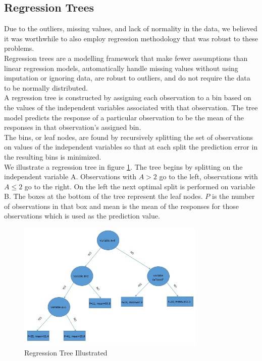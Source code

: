 \documentclass[12pt]{article}
\begin{document}
\subsection{Regression Trees}\label{sec:tree}
Due to the outliers, missing values, and lack of normality in the data, we believed it was worthwhile to also employ regression methodology that was robust to these problems. \\

Regression trees \cite{hastie2015statistical} are a modelling framework that make fewer assumptions than linear regression models, automatically handle missing values without using imputation or ignoring data, are robust to outliers, and do not require the data to be normally distributed. \\

A regression tree is constructed by assigning each observation to a bin based on the values of the independent variables associated with that observation. The tree model predicts the response of a particular observation to be the mean of the responses in that observation's assigned bin. \\

The bins, or leaf nodes, are found by recursively splitting the set of observations on values of the independent variables so that at each split the prediction error in the resulting bins is minimized.\\

We illustrate a regression tree in figure \ref{fig:reg_tree}. The tree begins by splitting on the independent variable A. Observations with $A>2$ go to the left, observations with $A \leq 2$ go to the right. On the left the next optimal split is performed on variable B. The boxes at the bottom of the tree represent the leaf nodes. $P$ is the number of observations in that box and mean is the mean of the responses for those observations which is used as the prediction value.

\begin{figure}[H]
\centering
\includegraphics[width=0.8\textwidth]{decision_tree_illustrated.jpg}
\caption{Regression Tree Illustrated}
\label{fig:reg_tree}
\end{figure}
\end{document}
